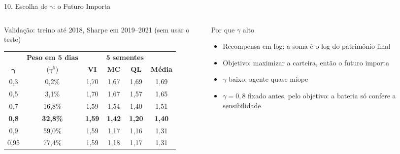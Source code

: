 \documentclass[aspectratio=169,10pt,t]{beamer}
\newenvironment{altura}[2][c]{\begin{minipage}[t][#2][#1]{\linewidth}}{\end{minipage}}
\begin{document}
\begin{frame}{10. Escolha de $\gamma$: o Futuro Importa}

  \begin{columns}[T,onlytextwidth]
    \begin{column}{0.60\textwidth}
      \begin{block}{Validação: treino até 2018, Sharpe em 2019--2021 (sem usar o teste)}
        \begin{altura}{4.2cm}
        \centering\scriptsize
        \setlength{\tabcolsep}{5pt}
        \renewcommand{\arraystretch}{1.15}
        \begin{tabular}{c c ccc c}
          \toprule
          & \textbf{Peso em 5 dias} & & \multicolumn{2}{c}{\textbf{5 sementes}} & \\
          \cmidrule(lr){4-5}
          $\boldsymbol{\gamma}$ & ($\gamma^5$) & \textbf{VI} & \textbf{MC} & \textbf{QL} & \textbf{Média} \\
          \midrule
          0,3  & 0,2\%  & 1,70 & 1,67 & 1,69 & 1,69 \\
          0,5  & 3,1\%  & 1,70 & 1,67 & 1,57 & 1,65 \\
          0,7  & 16,8\% & 1,59 & 1,54 & 1,40 & 1,51 \\
          \midrule
          \textbf{0,8} & \textbf{32,8\%} & \textbf{1,59} & \textbf{1,42} & \textbf{1,20} & \textbf{1,40} \\
          0,9  & 59,0\% & 1,59 & 1,17 & 1,16 & 1,31 \\
          0,95 & 77,4\% & 1,59 & 1,18 & 1,17 & 1,31 \\
          \bottomrule
        \end{tabular}
        \end{altura}
      \end{block}
    \end{column}

    \begin{column}{0.36\textwidth}
      \begin{block}{Por que $\gamma$ alto}
        \begin{altura}{4.2cm}
        \footnotesize
        \begin{itemize}\setlength{\itemsep}{4pt}
          \item Recompensa em log: a soma é o log do patrimônio final
          \item Objetivo: maximizar a carteira, então o futuro importa
          \item $\gamma$ baixo: agente quase míope
          \item $\gamma = 0{,}8$ fixado antes, pelo objetivo: a bateria só confere a sensibilidade
        \end{itemize}
        \end{altura}
      \end{block}
    \end{column}
  \end{columns}


\end{frame}
\end{document}

